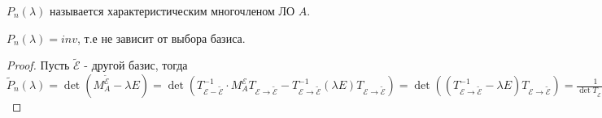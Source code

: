 \documentclass[../main.tex]{subfiles}
\begin{document}
\begin{definition}
    $P_{n}(\lambda)$ называется характеристическим многочленом ЛО $A$. 
\end{definition}
\begin{theorem}
    $P_{n}(\lambda)= inv$, т.е не зависит от выбора базиса. 
\end{theorem}
\begin{proof}
    Пусть $\tilde{\mathcal{E}}$ - другой базис, тогда $\tilde{P}_{n}(\lambda) = \det(M_{A}^{\tilde{\mathcal{E}}}-\lambda E)=\det{(T^{-1}_{\mathcal{E}-\tilde{\mathcal{E}}}\cdot M_{A}^{\mathcal{E}}T_{\mathcal{E}\to\tilde{\mathcal{E}}}- T^{-1}_{\mathcal{E}\to\tilde{\mathcal{E}}}(\lambda E)T_{\mathcal{E}\to\tilde{\mathcal{E}}})}=\det{((T^{-1}_{\mathcal{E}\to\tilde{\mathcal{E}}}-\lambda E)T_{\mathcal{E}\to\tilde{\mathcal{E}}})}= \frac{1}{\det{T_{\mathcal{E}\to\tilde{\mathcal{E}}}}}\cdot \det{(M_{A}^{\mathcal{E}}-\lambda E)\det{T_{\mathcal{E}\to \tilde{\mathcal{E}}}}}= det(M_{A}^{\mathcal{E}}-\lambda E)= P_{n}(\lambda)$
\end{proof}
\end{document}
